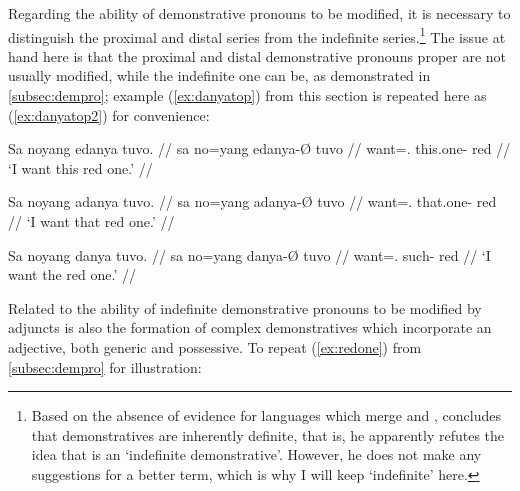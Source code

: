 \begin{morphlex}
\ex\label{ex:dempromorphlex}
\xe
\end{morphlex}

Regarding the ability of demonstrative pronouns to be modified, it is
necessary to distinguish the proximal  and distal
series from the indefinite series.\footnote{Based
on the absence of evidence for languages which merge  and ,
\citet[152]{lyons1999} concludes that demonstratives are inherently definite,
that is, he apparently refutes the idea that  is an `indefinite
demonstrative'. However, he does not make any suggestions for a better term,
which is why I will keep `indefinite' here.} The issue at hand here is that the
proximal and distal demonstrative pronouns proper are not usually modified,
while the indefinite one can be, as demonstrated in \autoref{subsec:dempro};
example (\ref{ex:danyatop}) from this section is repeated here as
(\ref{ex:danyatop2}) for convenience:

\pex
\a\ljudge\ques\begingl
	\gla Sa noyang edanya tuvo. //
	\glb sa no=yang edanya-Ø tuvo //
	\glc \PatT{} want=\Fsg{}.\Aarg{} this.one-\Top{} red //
	\glft `I want this red one.' //
\endgl

\a\ljudge\ques\begingl
	\gla Sa noyang adanya tuvo. //
	\glb sa no=yang adanya-Ø tuvo //
	\glc \PatT{} want=\Fsg{}.\Aarg{} that.one-\Top{} red //
	\glft `I want that red one.' //
\endgl

\a\label{ex:danyatop2}\begingl
	\gla Sa noyang danya tuvo. //
	\glb sa no=yang danya-Ø tuvo //
	\glc \PatT{} want=\Fsg{}.\Aarg{} such-\Top{} red //
	\glft `I want the red one.' //
\endgl
\xe

Related to the ability of indefinite demonstrative pronouns to be modified by
adjuncts is also the formation of complex demonstratives which incorporate an
adjective, both generic and possessive. To repeat (\ref{ex:redone}) from 
\autoref{subsec:dempro} for illustration:

